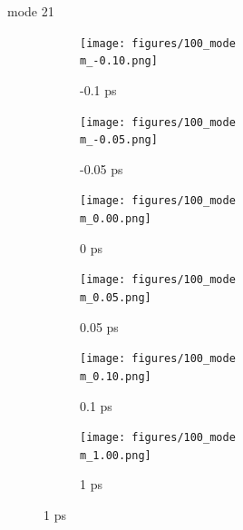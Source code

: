 \documentclass{beamer}
\newcommand\w{0.32}
\begin{document}
\renewcommand\m{21}
\begin{frame}{mode \m}
	\begin{figure}
		\centering
		\begin{subfigure}[b]{\w\textwidth}
			\centering
			\texttt{[image: figures/100\_mode\\m\_-0.10.png]}
			\caption{-0.1 ps}
		\end{subfigure}
		\begin{subfigure}[b]{\w\textwidth}
			\centering
			\texttt{[image: figures/100\_mode\\m\_-0.05.png]}
			\caption{-0.05 ps}
		\end{subfigure}
		\begin{subfigure}[b]{\w\textwidth}
			\centering
			\texttt{[image: figures/100\_mode\\m\_0.00.png]}
			\caption{0 ps}
		\end{subfigure}
		\begin{subfigure}[b]{\w\textwidth}
			\centering
			\texttt{[image: figures/100\_mode\\m\_0.05.png]}
			\caption{0.05 ps}
		\end{subfigure}
		\begin{subfigure}[b]{\w\textwidth}
			\centering
			\texttt{[image: figures/100\_mode\\m\_0.10.png]}
			\caption{0.1 ps}
		\end{subfigure}
		\begin{subfigure}[b]{\w\textwidth}
			\centering
			\texttt{[image: figures/100\_mode\\m\_1.00.png]}
			\caption{1 ps}
		\end{subfigure}
	\end{figure}
\end{frame}
\end{document}
